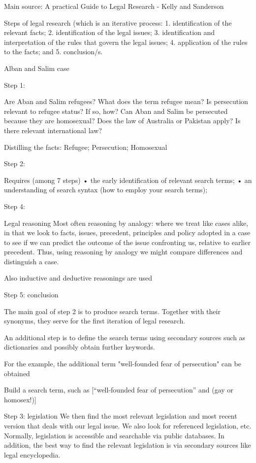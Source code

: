 Main source: A practical Guide to Legal Research - Kelly and Sanderson

Steps of legal research (which is an iterative process:
1. identification of the relevant facts;
2. identification of the legal issues;
3. identification and interpretation of the rules that govern the legal issues;
4. application of the rules to the facts; and
5. conclusion/s.

Alban and Salim case

Step 1:

Are Aban and Salim refugees? What does the term refugee mean?
Is persecution relevant to refugee status? If so, how?
Can Aban and Salim be persecuted because they are homosexual?
Does the law of Australia or Pakistan apply?
Is there relevant international law?

Distilling the facts: Refugee; Persecution; Homosexual

Step 2:

Requires (among 7 steps)
• the early identification of relevant search terms;
• an understanding of search syntax (how to employ your search terms);

Step 4:

Legal reasoning
Most often reasoning by analogy: where we treat like cases alike, in that we look to facts, issues, precedent, principles and policy adopted in a case to see if we can predict the outcome of the issue confronting us, relative to earlier precedent. Thus, using reasoning by analogy we might compare differences and distinguish a case.

Also inductive and deductive reasonings are used

Step 5: conclusion

The main goal of step 2 is to produce search terms. Together with their synonyms, they serve for the first iteration of legal research.

An additional step is to define the search terms using secondary sources such as dictionaries and possibly obtain further keywords.

For the example, the additional term "well-founded fear of persecution" can be obtained

Build a search term, such as [“well-founded fear of persecution” and (gay or homosex!)]

Step 3: legislation
We then find the most relevant legislation and most recent version that deals with our legal issue. We also look for referenced legislation, etc. Normally, legislation is accessible and searchable via public databases. In addition, the best way to find the relevant legislation is via secondary sources like legal encyclopedia.

